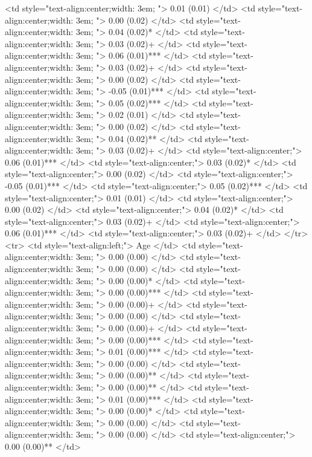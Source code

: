    <td style="text-align:center;width: 3em; "> 0.01 (0.01) </td>
   <td style="text-align:center;width: 3em; "> 0.00 (0.02) </td>
   <td style="text-align:center;width: 3em; "> 0.04 (0.02)* </td>
   <td style="text-align:center;width: 3em; "> 0.03 (0.02)+ </td>
   <td style="text-align:center;width: 3em; "> 0.06 (0.01)*** </td>
   <td style="text-align:center;width: 3em; "> 0.03 (0.02)+ </td>
   <td style="text-align:center;width: 3em; "> 0.00 (0.02) </td>
   <td style="text-align:center;width: 3em; "> -0.05 (0.01)*** </td>
   <td style="text-align:center;width: 3em; "> 0.05 (0.02)*** </td>
   <td style="text-align:center;width: 3em; "> 0.02 (0.01) </td>
   <td style="text-align:center;width: 3em; "> 0.00 (0.02) </td>
   <td style="text-align:center;width: 3em; "> 0.04 (0.02)** </td>
   <td style="text-align:center;width: 3em; "> 0.03 (0.02)+ </td>
   <td style="text-align:center;"> 0.06 (0.01)*** </td>
   <td style="text-align:center;"> 0.03 (0.02)* </td>
   <td style="text-align:center;"> 0.00 (0.02) </td>
   <td style="text-align:center;"> -0.05 (0.01)*** </td>
   <td style="text-align:center;"> 0.05 (0.02)*** </td>
   <td style="text-align:center;"> 0.01 (0.01) </td>
   <td style="text-align:center;"> 0.00 (0.02) </td>
   <td style="text-align:center;"> 0.04 (0.02)* </td>
   <td style="text-align:center;"> 0.03 (0.02)+ </td>
   <td style="text-align:center;"> 0.06 (0.01)*** </td>
   <td style="text-align:center;"> 0.03 (0.02)+ </td>
  </tr>
  <tr>
   <td style="text-align:left;"> Age </td>
   <td style="text-align:center;width: 3em; "> 0.00 (0.00) </td>
   <td style="text-align:center;width: 3em; "> 0.00 (0.00) </td>
   <td style="text-align:center;width: 3em; "> 0.00 (0.00)* </td>
   <td style="text-align:center;width: 3em; "> 0.00 (0.00)*** </td>
   <td style="text-align:center;width: 3em; "> 0.00 (0.00)+ </td>
   <td style="text-align:center;width: 3em; "> 0.00 (0.00) </td>
   <td style="text-align:center;width: 3em; "> 0.00 (0.00)+ </td>
   <td style="text-align:center;width: 3em; "> 0.00 (0.00)*** </td>
   <td style="text-align:center;width: 3em; "> 0.01 (0.00)*** </td>
   <td style="text-align:center;width: 3em; "> 0.00 (0.00) </td>
   <td style="text-align:center;width: 3em; "> 0.00 (0.00)** </td>
   <td style="text-align:center;width: 3em; "> 0.00 (0.00)** </td>
   <td style="text-align:center;width: 3em; "> 0.01 (0.00)*** </td>
   <td style="text-align:center;width: 3em; "> 0.00 (0.00)* </td>
   <td style="text-align:center;width: 3em; "> 0.00 (0.00) </td>
   <td style="text-align:center;width: 3em; "> 0.00 (0.00) </td>
   <td style="text-align:center;"> 0.00 (0.00)** </td>
